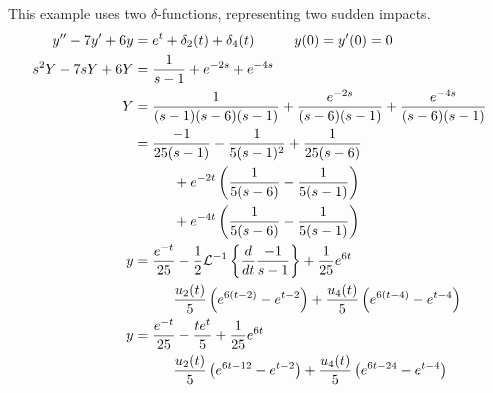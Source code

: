 \documentclass[fleqn,letterpaper]{report}
\begin{document}
\begin{example}
This example uses two $\delta$-functions, representing
two sudden impacts.
\begin{align*}
y^{\prime \prime} - 7y^\prime + 6y & = e^t + \delta_2(t) +
\delta_4(t) \hspace{1cm} y(0) = y^\prime(0) = 0 \\
s^2 Y - 7sY + 6Y & = \frac{1}{s-1} + e^{-2s} + e^{-4s} \\
Y & = \frac{1}{(s-1)(s-6)(s-1)} + \frac{e^{-2s}}{(s-6)(s-1)} +
\frac{e^{-4s}}{(s-6)(s-1)} \\
& = \frac{-1}{25(s-1)} - \frac{1}{5(s-1)^2} + \frac{1}{25(s-6)}
\\
& \hspace{1cm} + e^{-2t} \left( \frac{1}{5(s-6)} -
\frac{1}{5(s-1)} \right) \\
& \hspace{1cm} + e^{-4t} \left( \frac{1}{5(s-6)} -
\frac{1}{5(s-1)} \right) \\
y & = \frac{e^{-t}}{25} - \frac{1}{2} \mathcal{L}^{-1} \left\{
\frac{d}{dt} \frac{-1}{s-1} \right\} + \frac{1}{25} e^{6t} \\
& \hspace{1cm} \frac{u_2(t)}{5} \left( e^{6(t-2)}- e^{t-2}
\right) + \frac{u_4(t)}{5} \left( e^{6(t-4)}- e^{t-4} \right) \\
y & = \frac{e^{-t}}{25} - \frac{te^t}{5} + \frac{1}{25} e^{6t} \\
& \hspace{1cm} \frac{u_2(t)}{5} \left( e^{6t-12}- e^{t-2} \right) +
\frac{u_4(t)}{5} \left( e^{6t-24}- e^{t-4} \right) 
\end{align*} 
\end{example}
\end{document}
